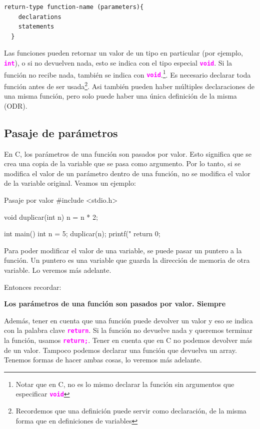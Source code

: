 \documentclass[]{scrartcl}
\newcommand{\hl}[1]{\textcolor{magenta}{\textbf{\texttt{#1}}}}
\begin{document}
\begin{center}
  \begin{Verbatim}[fontshape=it]
  return-type function-name (parameters){
    declarations
    statements
  }	
  \end{Verbatim}
\end{center}

Las funciones pueden retornar un valor de un tipo en particular (por ejemplo, \hl{int}), o si no devuelven nada, esto se indica con el tipo especial \hl{void}. Si la función no recibe nada, también se indica con \hl{void}.\footnote{Notar que en C, no es lo mismo declarar la función sin argumentos que especificar \hl{void}}. Es necesario declarar toda función antes de ser usada\footnote{Recordemos que una definición puede servir como declaración, de la misma forma que en definiciones de variables}. Asi también pueden haber múltiples declaraciones de una misma función, pero solo puede haber una única definición de la misma (ODR).

\subsection*{Pasaje de parámetros}

En C, los parámetros de una función son pasados por valor. Esto significa que se crea una copia de la variable que se pasa como argumento. Por lo tanto, si se modifica el valor de un parámetro dentro de una función, no se modifica el valor de la variable original. Veamos un ejemplo:

\begin{cbox}[]{Pasaje por valor}
  #include <stdio.h>
  
  void duplicar(int n) {
    n = n * 2;
  }
  
  int main() {
    int n = 5;
    duplicar(n);
    printf("%
    return 0;
  }
\end{cbox}

Para poder modificar el valor de una variable, se puede pasar un puntero a la función. Un puntero es una variable que guarda la dirección de memoria de otra variable. Lo veremos más adelante.

Entonces recordar:

\begin{importantbox}
  \centering
  \textbf{Los parámetros de una función son pasados por valor. Siempre}
\end{importantbox}

Además, tener en cuenta que una función puede devolver un valor y eso se indica con la palabra clave \hl{return}. Si la función no devuelve nada y queremos terminar la función, usamos \hl{return;}. Tener en cuenta que en C no podemos devolver más de un valor. Tampoco podemos declarar una función que devuelva un array. Tenemos formas de hacer ambas cosas, lo veremos más adelante.
\end{document}
